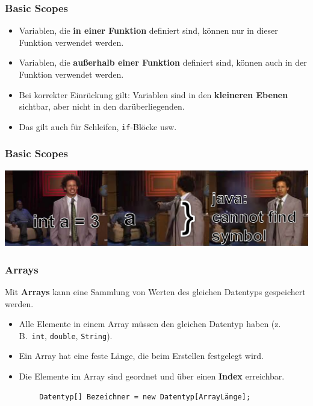 \documentclass{../../presentation}
\begin{document}
\begin{frame}[fragile]
    \frametitle{Basic Scopes}
    \begin{itemize}
        \item Variablen, die \textbf{in einer Funktion} definiert sind, können nur in dieser Funktion verwendet werden.
        \item Variablen, die \textbf{außerhalb einer Funktion} definiert sind, können auch in der Funktion verwendet werden.
        \item Bei korrekter Einrückung gilt: Variablen sind in den \textbf{kleineren Ebenen} sichtbar, aber nicht in den darüberliegenden.
        \item Das gilt auch für Schleifen, \texttt{if}-Blöcke usw.
    \end{itemize}
\end{frame}

\begin{frame}[fragile]
    \frametitle{Basic Scopes}
    \includegraphics[width=1\linewidth]{img/scopesmemehoriz.png}
\end{frame}


\begin{frame}[fragile]
    \frametitle{Arrays}
    Mit \textbf{Arrays} kann eine Sammlung von Werten des gleichen Datentyps gespeichert werden.
    \begin{itemize}
        \item Alle Elemente in einem Array müssen den gleichen Datentyp haben (z.\,B.\ \texttt{int}, \texttt{double}, \texttt{String}).
        \item Ein Array hat eine feste Länge, die beim Erstellen festgelegt wird.
        \item Die Elemente im Array sind geordnet und über einen \textbf{Index} erreichbar.
    \end{itemize}
    \begin{verbatim}
        Datentyp[] Bezeichner = new Datentyp[ArrayLänge];
    \end{verbatim}
\end{frame}
\end{document}
